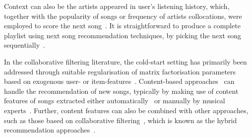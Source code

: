 Context can also be the artists appeared in user's listening history,
which, together with the popularity of songs or frequency of artists collocations,
were employed to score the next song~\cite{mcfee2012million,bonnin2013evaluating}.
It is straightforward to produce a complete playlist using next song recommendation techniques,
\ie by picking the next song sequentially~\cite{bonnin2013evaluating,ben2017groove}.
%


In the collaborative filtering literature,
the cold-start setting has primarily been addressed through
suitable regularisation of matrix factorisation parameters
based on exogenous user- or item-features~\cite{Ma:2008,Agarwal:2009,Cao:2010}.
%
Content-based approaches~\cite[chap. 4]{aggarwal2016recommender}
can handle the recommendation of new songs,
typically by making use of content features of songs extracted either automatically~\cite{seyerlehner2010automatic,eghbal2015vectors}
or manually by musical experts~\cite{john2006pandora}.
Further, content features can also be combined with other approaches, such as those based on 
collaborative filtering~\cite{yoshii2006hybrid,donaldson2007hybrid,shao2009music},
which is known as the hybrid recommendation approaches~\cite{burke2002hybrid,aggarwal2016recommender}.
%

